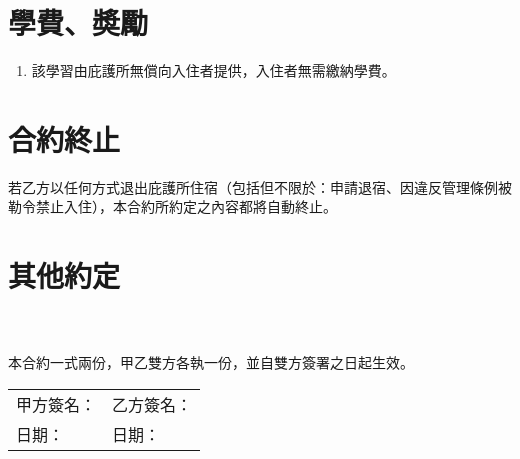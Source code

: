 \documentclass[12pt]{article}
\begin{document}
	\section{學費、奬勵}
		\begin{enumerate}
			\item 該學習由庇護所無償向入住者提供，入住者無需繳納學費。
		\end{enumerate}
	\section{合約終止}
		若乙方以任何方式退出庇護所住宿（包括但不限於：申請退宿、因違反管理條例被勒令禁止入住），本合約所約定之內容都將自動終止。
	\section{其他約定}
	\underline{\hspace{15cm}}\\
	\underline{\hspace{15cm}}\\
	
	\vspace{2em}
	本合約一式兩份，甲乙雙方各執一份，並自雙方簽署之日起生效。
	
	\vspace{3em}
	\begin{tabular}{p{7cm}p{7cm}}
		甲方簽名：\underline{\hspace{10em}} & 乙方簽名：\underline{\hspace{10em}} \\
		日期：\underline{\hspace{12em}} & 日期：\underline{\hspace{12em}} \\
	\end{tabular}
	
\end{document}

